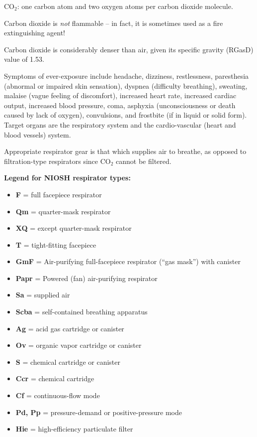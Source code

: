 







CO$_{2}$: one carbon atom and two oxygen atoms per carbon dioxide molecule.

\vskip 10pt

Carbon dioxide is {\it not} flammable -- in fact, it is sometimes used as a fire extinguishing agent!

\vskip 10pt

Carbon dioxide is considerably denser than air, given its specific gravity (RGasD) value of 1.53.

\vskip 10pt

Symptoms of ever-exposure include headache, dizziness, restlessness, paresthesia (abnormal or impaired skin sensation), dyspnea (difficulty breathing), sweating, malaise (vague feeling of discomfort), increased heart rate, increased cardiac output, increased blood pressure, coma, asphyxia (unconsciousness or death caused by lack of oxygen), convulsions, and frostbite (if in liquid or solid form).  Target organs are the respiratory system and the cardio-vascular (heart and blood vessels) system.

\vskip 10pt

Appropriate respirator gear is that which supplies air to breathe, as opposed to filtration-type respirators since CO$_{2}$ cannot be filtered.

\vskip 10pt

\noindent
{\bf Legend for NIOSH respirator types:}

\begin{itemize}
\item{} {\bf F} = full facepiece respirator
\item{} {\bf Qm} = quarter-mask respirator
\item{} {\bf XQ} = except quarter-mask respirator
\item{} {\bf T} = tight-fitting facepiece
\item{} {\bf GmF} = Air-purifying full-facepiece respirator (``gas mask'') with canister
\item{} {\bf Papr} = Powered (fan) air-purifying respirator
\item{} {\bf Sa} = supplied air
\item{} {\bf Scba} = self-contained breathing apparatus
\item{} {\bf Ag} = acid gas cartridge or canister
\item{} {\bf Ov} = organic vapor cartridge or canister
\item{} {\bf S} = chemical cartridge or canister
\item{} {\bf Ccr} = chemical cartridge
\item{} {\bf Cf} = continuous-flow mode
\item{} {\bf Pd, Pp} = pressure-demand or positive-pressure mode
\item{} {\bf Hie} = high-efficiency particulate filter
\end{itemize}




